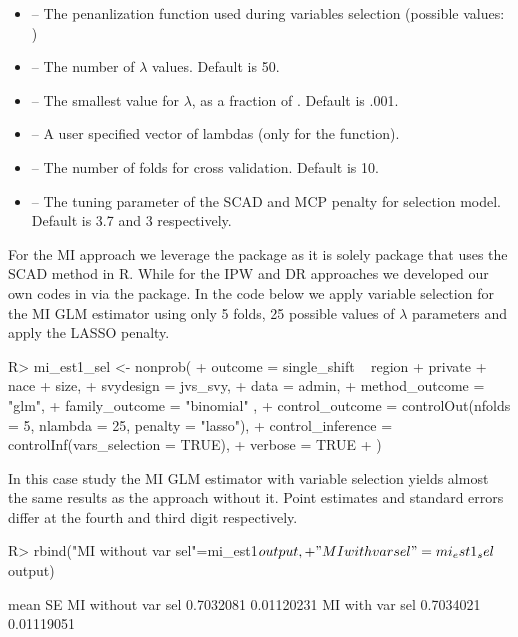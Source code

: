 \documentclass[
]{jss}
\begin{document}
\begin{itemize}
\item {} -- The penanlization function used during variables selection (possible values: )
\item {} -- The number of $\lambda$ values. Default is 50.
\item {} -- The smallest value for $\lambda$, as a fraction of . Default is .001.
\item {} -- A user specified vector of lambdas (only for the  function).
\item {} -- The number of folds for cross validation. Default is 10.
\item {} -- The tuning parameter of the SCAD and MCP penalty for selection model. Default is 3.7 and 3 respectively.
\end{itemize}

For the MI approach we leverage the  package \citep{ncvreg}
as it is solely package that uses the SCAD method in R. While for the
IPW and DR approaches we developed our own codes in  via
the  package. In the code below we apply variable selection
for the MI GLM estimator using only 5 folds, 25 possible values of
\(\lambda\) parameters and apply the LASSO penalty.

\begin{CodeChunk}
\begin{CodeInput}
R> mi_est1_sel <- nonprob(
+   outcome = single_shift ~ region + private + nace + size,
+   svydesign = jvs_svy,
+   data = admin,
+   method_outcome = "glm",
+   family_outcome = "binomial" ,
+   control_outcome = controlOut(nfolds = 5, nlambda = 25, penalty = "lasso"),
+   control_inference = controlInf(vars_selection = TRUE),
+   verbose = TRUE
+ )
\end{CodeInput}
\end{CodeChunk}

In this case study the MI GLM estimator with variable selection yields
almost the same results as the approach without it. Point estimates and
standard errors differ at the fourth and third digit respectively.

\begin{CodeChunk}
\begin{CodeInput}
R> rbind("MI without var sel"=mi_est1$output,
+       "MI with var sel"=mi_est1_sel$output)
\end{CodeInput}
\begin{CodeOutput}
                        mean         SE
MI without var sel 0.7032081 0.01120231
MI with var sel    0.7034021 0.01119051
\end{CodeOutput}
\end{CodeChunk}
\end{document}
